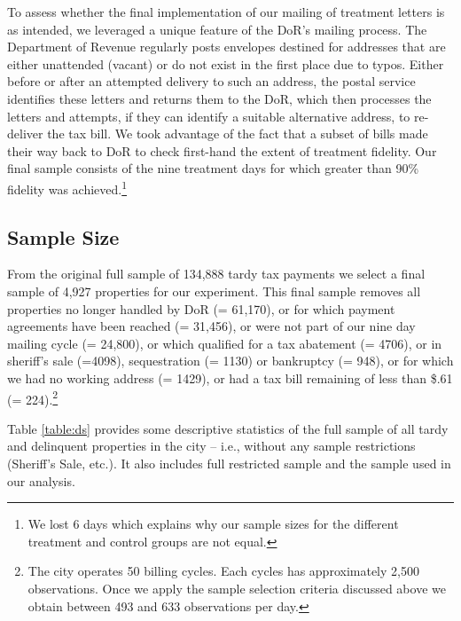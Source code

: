\documentclass[12pt,titlepage]{article}
\begin{document}
To assess whether the final implementation of our mailing of treatment
letters is as intended, we leveraged a unique feature of the DoR's
mailing process.  The Department of Revenue regularly posts envelopes
destined for addresses that are either unattended (vacant) or do not
exist in the first place due to typos. Either before or after an
attempted delivery to such an address, the postal service identifies
these letters and returns them to the DoR, which then processes the
letters and attempts, if they can identify a suitable alternative
address, to re-deliver the tax bill. We took advantage of the fact
that a subset of bills made their way back to DoR to check first-hand
the extent of treatment fidelity. Our final sample consists of the
nine treatment days for which greater than 90\% fidelity was achieved.\footnote{We 
lost 6 days which explains why our sample sizes for the different treatment and
control groups are not equal.}

\subsection{Sample Size}

From the original full sample of 134,888 tardy tax payments we select a
final sample of 4,927 properties for our experiment.  This final
sample removes all properties no longer handled by DoR (= 61,170), or
for which payment agreements have been reached (= 31,456), or were not
part of our nine day mailing cycle (= 24,800), or which qualified for
a tax abatement (= 4706), or in sheriff's sale (=4098), sequestration
(= 1130) or bankruptcy (= 948), or for which we had no working address
(= 1429), or had a tax bill remaining of less than \$.61 (=
224).\footnote{The city operates 50 billing cycles. Each cycles has
  approximately 2,500 observations.  Once we apply the sample
  selection criteria discussed above we obtain between 493 and 633
  observations per day.}


Table \ref{table:ds} provides some descriptive statistics of the full
sample of all tardy and delinquent properties in the city -- i.e.,
without any sample restrictions (Sheriff's Sale, etc.). It also
includes full restricted sample and the sample used in our analysis.
\end{document}
